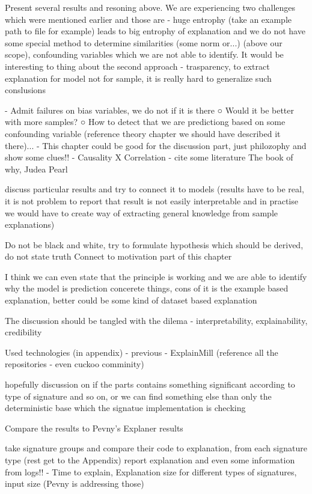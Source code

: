 Present several results and resoning above.
We are experiencing two challenges which were mentioned earlier and those are - huge entrophy (take an example path to file for example) leads to big entrophy of explanation and we do not have some special method to determine similarities (some norm or...) (above our scope), confounding variables which we are not able to identify.
It would be interesting to thing about the second approach - trasparency, to extract explanation for model not for sample, it is really hard to generalize such conslusions

- Admit failures on bias variables, we do not if it is there
○ Would it be better with more samples?
○ How to detect that we are predictiong based on some confounding variable (reference theory chapter we should have described it there)...
- This chapter could be good for the discussion part, just philozophy and show some clues!!
- Causality X Correlation - cite some literature
The book of why, Judea Pearl

discuss particular results and try to connect it to models (results have to be real, it is not problem to report that result is not easily interpretable and in practise we would have to create way of extracting general knowledge from sample explanations)



Do not be black and white, try to formulate hypothesis which should be derived, do not state truth
Connect to motivation part of this chapter

I think we can even state that the principle is working and we are able to identify why the model is prediction concerete things, cons of it is the example based explanation, better could be some kind of dataset based explanation

The discussion should be tangled with the dilema - interpretability, explainability, credibility


Used technologies (in appendix)
  - previous
  - ExplainMill
  (reference all the repositories - even cuckoo comminity)



  hopefully discussion on if the parts contains something significant according to type of signature and so on, or we can find something else than only the deterministic base which the signatue implementation is checking


  Compare the results to Pevny's Explaner results

  take signature groups and compare their code to explanation, from each signature type (rest get to the Appendix)
  report explanation and even some information from logs!!
  - Time to explain, Explanation size for different types of signatures, input size (Pevny is addressing those)





